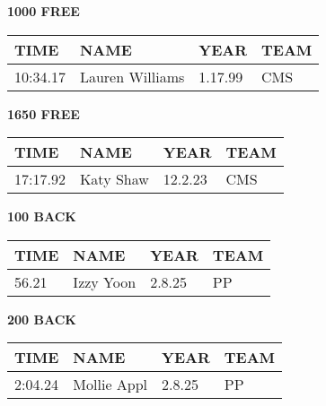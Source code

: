 \vspace{0.4cm}

\begin{minipage}[t]{0.48\textwidth}
\centering
\textbf{1000 FREE}\\[0.05cm]
\begin{tabular}{@{}p{1.8cm}p{2.8cm}p{1.2cm}p{1.4cm}@{}}
\hline
\textbf{TIME} & \textbf{NAME} & \textbf{YEAR} & \textbf{TEAM} \\
\hline
10:34.17 & Lauren Williams & 1.17.99 & CMS \\
\hline
\end{tabular}
\end{minipage}\hfill
\begin{minipage}[t]{0.48\textwidth}
\centering
\textbf{1650 FREE}\\[0.05cm]
\begin{tabular}{@{}p{1.8cm}p{2.8cm}p{1.2cm}p{1.4cm}@{}}
\hline
\textbf{TIME} & \textbf{NAME} & \textbf{YEAR} & \textbf{TEAM} \\
\hline
17:17.92 & Katy Shaw & 12.2.23 & CMS \\
\hline
\end{tabular}
\end{minipage}

\vspace{0.4cm}

\begin{minipage}[t]{0.48\textwidth}
\centering
\textbf{100 BACK}\\[0.05cm]
\begin{tabular}{@{}p{1.8cm}p{2.8cm}p{1.2cm}p{1.4cm}@{}}
\hline
\textbf{TIME} & \textbf{NAME} & \textbf{YEAR} & \textbf{TEAM} \\
\hline
56.21 & Izzy Yoon & 2.8.25 & PP \\
\hline
\end{tabular}
\end{minipage}\hfill
\begin{minipage}[t]{0.48\textwidth}
\centering
\textbf{200 BACK}\\[0.05cm]
\begin{tabular}{@{}p{1.8cm}p{2.8cm}p{1.2cm}p{1.4cm}@{}}
\hline
\textbf{TIME} & \textbf{NAME} & \textbf{YEAR} & \textbf{TEAM} \\
\hline
2:04.24 & Mollie Appl & 2.8.25 & PP \\
\hline
\end{tabular}
\end{minipage}

\vspace{0.4cm}

